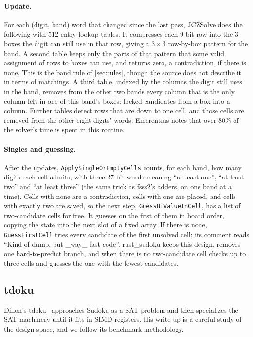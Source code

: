 \documentclass[11pt]{article}
\theoremstyle{definition}
\theoremstyle{plain}
\begin{document}
\paragraph{Update.} For each (digit, band) word that changed since the last pass, JCZSolve does the following with
512-entry lookup tables. It compresses each 9-bit row into the 3 boxes the digit can still use in that row, giving a
$3\times 3$ row-by-box pattern for the band. A second table keeps only the parts of that pattern that some valid
assignment of rows to boxes can use, and returns zero, a contradiction, if there is none. This is the band rule of
\cref{sec:rules}, though the source does not describe it in terms of matchings. A third table, indexed by the columns
the digit still uses in the band, removes from the other two bands every column that is the only column left in one
of this band's boxes: locked candidates from a box into a column. Further tables detect rows that are down to one
cell, and those cells are removed from the other eight digits' words. Emerentius notes that over 80\% of the solver's
time is spent in this routine.

\paragraph{Singles and guessing.} After the updates, \texttt{ApplySingleOrEmptyCells} counts, for each band, how many
digits each cell admits, with three 27-bit words meaning ``at least one'', ``at least two'' and ``at least three''
(the same trick as fsss2's adders, on one band at a time). Cells with none are a contradiction, cells with one are
placed, and cells with exactly two are saved, so the next step, \texttt{GuessBiValueInCell}, has a list of
two-candidate cells for free. It guesses on the first of them in board order, copying the state into the next slot of
a fixed array. If there is none, \texttt{GuessFirstCell} tries every candidate of the first unsolved cell; its
comment reads ``Kind of dumb, but \_way\_ fast code''. rust\_sudoku keeps this design, removes one hard-to-predict
branch, and when there is no two-candidate cell checks up to three cells and guesses the one with the fewest
candidates.

\subsection{tdoku}

Dillon's tdoku~\cite{dillon2019tdoku,dillon2019nerdsniped} approaches Sudoku as a SAT problem and then specializes the
SAT machinery until it fits in SIMD registers. His write-up is a careful study of the design space, and we follow its
benchmark methodology.
\end{document}
